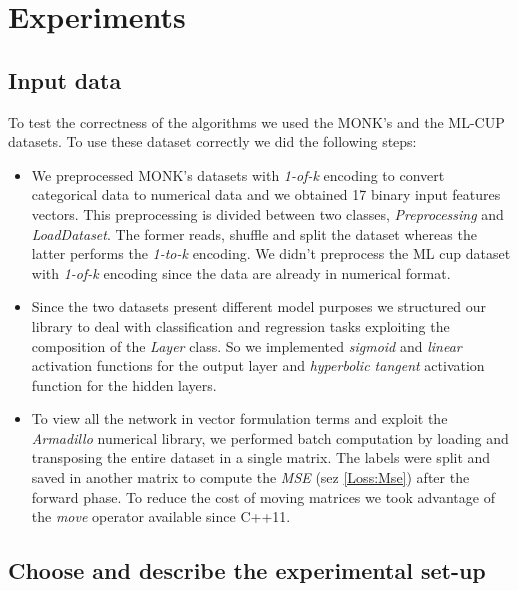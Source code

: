 \section{Experiments}


\subsection{Input data}
To test the correctness of the algorithms we used the MONK's and the ML-CUP datasets. To use these dataset correctly we did the following steps:
\begin{itemize}
	\item We preprocessed MONK's datasets with \textit{1-of-k} encoding to convert categorical data to numerical data and we obtained 17 binary input features vectors. This preprocessing is divided between two classes, \textit{Preprocessing} and \textit{LoadDataset}. The former reads, shuffle and split the dataset whereas the latter performs the \textit{1-to-k} encoding. We didn't preprocess the ML cup dataset with \textit{1-of-k} encoding since the data are already in numerical format.
	\item Since the two datasets present different model purposes we structured our library to deal with classification and regression tasks exploiting the composition of the \textit{Layer} class.  So we implemented \textit{sigmoid} and \textit{linear} activation functions for the output layer and \textit{hyperbolic tangent} activation function for the hidden layers.
	\item To view all the network in vector formulation terms and exploit the \textit{Armadillo} numerical library, we performed batch computation by loading and transposing the entire dataset in a single matrix. The labels were split and saved in another matrix to compute the \textit{MSE} (sez \ref{Loss:Mse}) after the forward phase. To reduce the cost of moving matrices we took advantage of the \textit{move} operator available since C++11. 
\end{itemize}

\subsection{Choose and describe the experimental set-up}

